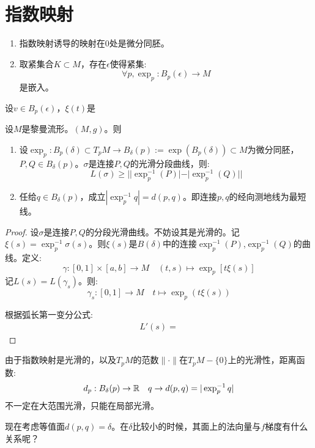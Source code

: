     \section{指数映射}
    \begin{proposition}[指数映射的性质]
        \begin{enumerate}
            \item 指数映射诱导的映射在$0$处是微分同胚。
            \item 取紧集合$K \subset M$，存在$\epsilon$使得紧集:
            $$
            \forall p ,\exp_p:B_p(\epsilon) \to M
            $$
            是嵌入。
        \end{enumerate}
    \end{proposition}
    \begin{proposition}
        设$v \in B_p(\epsilon)$，$\xi(t)$是
    \end{proposition}
    \begin{proposition}
        设$M$是黎曼流形。$(M,g)$。则
        \begin{enumerate}
            \item 设$\exp_p:B_p(\delta)\subset T_pM\to B_{\delta}(p):=\exp(B_p(\delta))\subset M$为微分同胚，$P,Q\in B_{\delta}(p)$。$\sigma$是连接$P,Q$的光滑分段曲线，则:
            $$
            L(\sigma)\geq ||\exp_p^{-1}(P)|- |\exp_p^{-1}(Q)||
            $$
            \item 任给$q \in B_{\delta}(p)$，成立$|\exp_p^{-1}q|=d(p,q)$。即连接$p,q$的经向测地线为最短线。
        \end{enumerate}
    \end{proposition}
    \begin{proof}
        设$\sigma$是连接$P,Q$的分段光滑曲线。不妨设其是光滑的。记$\xi(s)=\exp_p^{-1}\sigma(s)$。则$\xi(s)$是$B(\delta)$中的连接$\exp_p^{-1}(P)$,$\exp_p^{-1}(Q)$的曲线。定义:
        $$
        \gamma:[0,1]\times [a,b] \to M \quad (t,s) \mapsto \exp_p[t\xi(s)]
        $$
        记$L(s)=L(\gamma_s)$。则:
        $$
        \gamma_s:[0,1] \to M \quad t \mapsto \exp_p(t\xi(s))
        $$

        根据弧长第一变分公式:
        \begin{align*}
            L'(s)=
        \end{align*}
    \end{proof}
    \begin{remark}
        由于指数映射是光滑的，以及$T_pM$的范数$\|\cdot\|$在$T_pM-\{0\}$上的光滑性，距离函数:
        $$
        d_p: B_{\delta}(p) \to \mathbb{R} \quad q \to d(p,q)=|\exp_p^{-1} q| 
        $$
        不一定在大范围光滑，只能在局部光滑。
    \end{remark}
    现在考虑等值面$d(p,q)=\delta$。在$\delta$比较小的时候，其面上的法向量与$f$梯度有什么关系呢？

